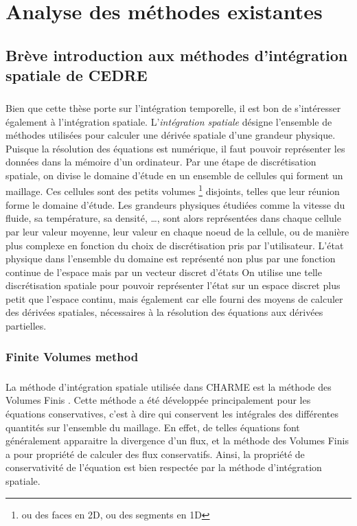 \chapter{Analyse des méthodes existantes}


  \section{Brève introduction aux méthodes d'intégration spatiale de CEDRE}

    \paragraph{}
    Bien que cette thèse porte sur l'intégration temporelle, il est bon de s'intéresser également à l'intégration spatiale.
    L'\emph{intégration spatiale} désigne l'ensemble de méthodes utilisées pour calculer une dérivée spatiale d'une grandeur physique.
    Puisque la résolution des équations est numérique, il faut pouvoir représenter les données dans la mémoire d'un ordinateur.
    Par une étape de discrétisation spatiale, on divise le domaine d'étude en un ensemble de cellules qui forment un maillage.
    Ces cellules sont des petits volumes \footnote{ou des faces en 2D, ou des segments en 1D} disjoints, telles que leur réunion forme le domaine d'étude.
    Les grandeurs physiques étudiées comme la vitesse du fluide, sa température, sa densité, \dots, sont alors représentées dans chaque cellule par leur valeur moyenne, leur valeur en chaque noeud de la cellule, ou de manière plus complexe en fonction du choix de discrétisation pris par l'utilisateur.
    L'état physique dans l'ensemble du domaine est représenté non plus par une fonction continue de l'espace mais par un vecteur discret d'états
    On utilise une telle discrétisation spatiale pour pouvoir représenter l'état sur un espace discret plus petit que l'espace continu, mais également car elle fourni des moyens de calculer des dérivées spatiales, nécessaires à la résolution des équations aux dérivées partielles.


    \subsection{Finite Volumes method}

      \paragraph{}
      La méthode d'intégration spatiale utilisée dans CHARME est la méthode des Volumes Finis \cite{EymardGallouetHerbin2000}.
      Cette méthode a été développée principalement pour les équations conservatives, c'est à dire qui conservent les intégrales des différentes quantités sur l'ensemble du maillage.
      En effet, de telles équations font généralement apparaitre la divergence d'un flux, et la méthode des Volumes Finis a pour propriété de calculer des flux conservatifs.
      Ainsi, la propriété de conservativité de l'équation est bien respectée par la méthode d'intégration spatiale.

